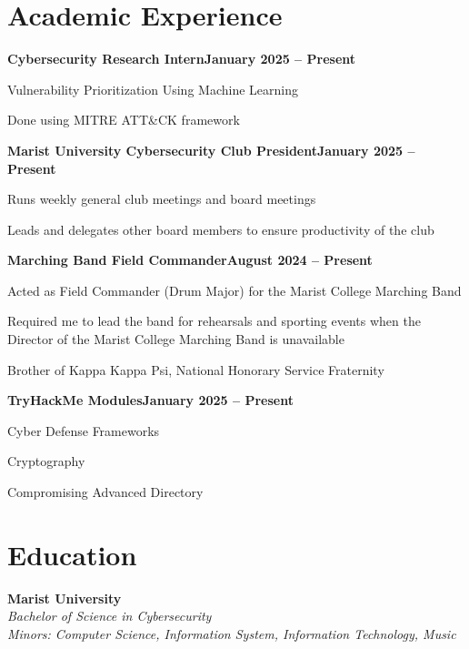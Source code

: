 \documentclass[letterpaper,10pt]{article}
\newcommand{\heading}[2]{
  \hspace{10pt}#1\hfill#2\\
}
\newcommand{\headingBf}[2]{
  \heading{\textbf{#1}}{\textbf{#2}}
}
\newcommand{\headingIt}[2]{
  \heading{\textit{#1}}{\textit{#2}}
}
\newenvironment{resume_list}{
  \vspace{-7pt}
  \begin{itemize}[itemsep=-2px, parsep=1pt, leftmargin=30pt]
}{
  \end{itemize}
}
\begin{document}
  \section{Academic Experience}

  \headingBf{Cybersecurity Research Intern}{January 2025 -- Present}
  \begin{resume_list}
    \item Vulnerability Prioritization Using Machine Learning 
    \item Done using MITRE ATT\&CK framework
    \end{resume_list}

   \headingBf{Marist University Cybersecurity Club President}{January 2025 -- Present}
  \begin{resume_list}
        \item Runs weekly general club meetings and board meetings
        \item Leads and delegates other board members to ensure productivity of the club 
  \end{resume_list}

   \headingBf{Marching Band Field Commander}{August 2024 -- Present}
  \begin{resume_list}
      \item Acted as Field Commander (Drum Major) for the Marist College Marching Band  
    \item Required me to lead the band for rehearsals and sporting events when the Director of the Marist College Marching Band is unavailable  
    \item Brother of Kappa Kappa Psi, National Honorary Service Fraternity 
  \end{resume_list}

   \headingBf{TryHackMe Modules}{January 2025 -- Present}
  \begin{resume_list}
      \item Cyber Defense Frameworks
    \item Cryptography
    \item Compromising Advanced Directory
  \end{resume_list}
  \section{Education}

  \headingBf{Marist University}{} 
  \headingIt{Bachelor of Science in Cybersecurity}{}
  \headingIt{Minors: Computer Science, Information System, Information Technology, Music}{}
\end{document}
